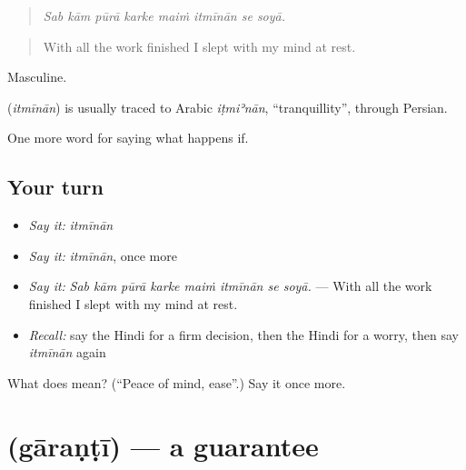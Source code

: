 \begin{quote}
       
\end{quote}

\begin{quote}
\emph{Sab kām pūrā karke maiṁ itmīnān se soyā.}
\end{quote}

\begin{quote}
With all the work finished I slept with my mind at rest.
\end{quote}

Masculine.

\begin{cousinweb}
\textbf{} (\emph{itmīnān}) is usually traced to Arabic \emph{iṭmiʾnān}, \textquotedblleft{}tranquillity\textquotedblright{}, through Persian.
\end{cousinweb}

\begin{grammarlens}[title={What you've built}]
One more word for saying what happens if.
\end{grammarlens}

\subsection*{Your turn}
\begin{itemize}
\raggedright
  \item \emph{Say it:} \emph{itmīnān}
  \item \emph{Say it:} \emph{itmīnān}, once more
  \item \emph{Say it:} \emph{Sab kām pūrā karke maiṁ itmīnān se soyā.} — With all the work finished I slept with my mind at rest.
  \item \emph{Recall:} say the Hindi for a firm decision, then the Hindi for a worry, then say \emph{itmīnān} again
\end{itemize}

\begin{tcolorbox}[breakable,colback=teal!4,colframe=teal!35!black,title={Before you move on}]
What does  mean? (\textquotedblleft{}Peace of mind, ease\textquotedblright{}.) Say it once more.
\end{tcolorbox}
\section[\texorpdfstring{\hi{गारंटी} (gāraṇṭī)}{गारंटी (gāraṇṭī)}]{ (gāraṇṭī) — a guarantee}

